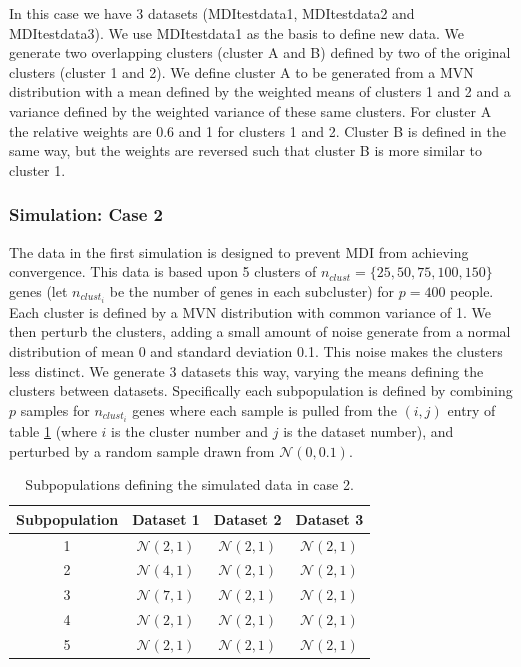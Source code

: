 \documentclass[12pt]{article} %
\begin{document}
	In this case we have 3 datasets (MDItestdata1, MDItestdata2 and MDItestdata3). We use MDItestdata1 as the basis to define new data. We generate two overlapping clusters (cluster A and B) defined by two of the original clusters (cluster  1 and 2). We define cluster A to be generated from a MVN distribution with a mean defined by the weighted means of clusters 1 and 2 and a variance defined by the weighted variance of these same clusters. For cluster A the relative weights are 0.6 and 1 for clusters 1 and 2. Cluster B is defined in the same way, but the weights are reversed such that cluster B is more similar to cluster 1.
	
	\subsubsection{Simulation: Case 2} \label{sec:sim:data:case_2}
	The data in the first simulation is designed to prevent MDI from achieving convergence. This data is based upon 5 clusters of $n_{clust}=\{25, 50, 75, 100, 150\}$ genes (let $n_{clust_i}$ be the number of genes in each subcluster) for $p=400$ people. Each cluster is defined by a MVN distribution with common variance of 1. We then perturb the clusters, adding a small amount of noise generate from a normal distribution of mean 0 and standard deviation 0.1. This noise makes the clusters less distinct. We generate 3 datasets this way, varying the means defining the clusters between datasets. Specifically each subpopulation is defined by combining $p$ samples for $n_{clust_i}$ genes where each sample is pulled from the $(i, j)$ entry of table \ref{table:generated_data_case_2} (where $i$ is the cluster number and $j$ is the dataset number), and perturbed by a random sample drawn from $\mathcal{N}(0,0.1)$.

\begin{table}[!htb] 
	\centering
	\begin{tabular}{c|ccc} 
		Subpopulation	& Dataset 1	& Dataset 2	& Dataset 3	\\ 
		\hline
		1 		& $\mathcal{N}(2,1)$	& $\mathcal{N}(2,1)$ 	& $\mathcal{N}(2,1)$	\\
		2 		& $\mathcal{N}(4,1)$	& $\mathcal{N}(2,1)$ 	& $\mathcal{N}(2,1)$	\\
		3 		& $\mathcal{N}(7,1)$	& $\mathcal{N}(2,1)$ 	& $\mathcal{N}(2,1)$	\\
		4 		& $\mathcal{N}(2,1)$	& $\mathcal{N}(2,1)$ 	& $\mathcal{N}(2,1)$	\\
		5 		& $\mathcal{N}(2,1)$	& $\mathcal{N}(2,1)$ 	& $\mathcal{N}(2,1)$	
	\end{tabular}
	\caption{Subpopulations defining the simulated data in case 2.}
	\label{table:generated_data_case_2}
\end{table}
\end{document}

